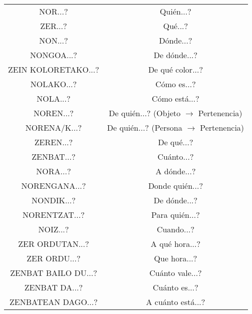 \documentclass[12pt, a4paper, landscape]{article}
\begin{document}
\begin{table}[h]
\begin{center}
\begin{tabular}{||cc}
NOR...? & Quién...? \\
ZER...? & Qué...? \\
NON...? & Dónde...? \\
NONGOA...? & De dónde...? \\
ZEIN KOLORETAKO...? & De qué color...? \\
NOLAKO...? & Cómo es...? \\
NOLA...? & Cómo está...? \\
NOREN...? & De quién...? (Objeto $\to$ Pertenencia)\\
NORENA/K...? & De quién...? (Persona $\to$ Pertenencia) \\
ZEREN...? & De qué...? \\
ZENBAT...? & Cuánto...? \\
NORA...? & A dónde...? \\
NORENGANA...? & Donde quién...? \\
NONDIK...? & De dónde...? \\
NORENTZAT...? & Para quién...? \\
NOIZ...? & Cuando...? \\
ZER ORDUTAN...? & A qué hora...? \\
ZER ORDU...? & Que hora...?\\
ZENBAT BAILO DU...?  & Cuánto vale...?\\
ZENBAT DA...? & Cuánto es...?\\
ZENBATEAN DAGO...? & A cuánto está...?
\end{tabular}
\end{center}
\end{table}
\end{document}
